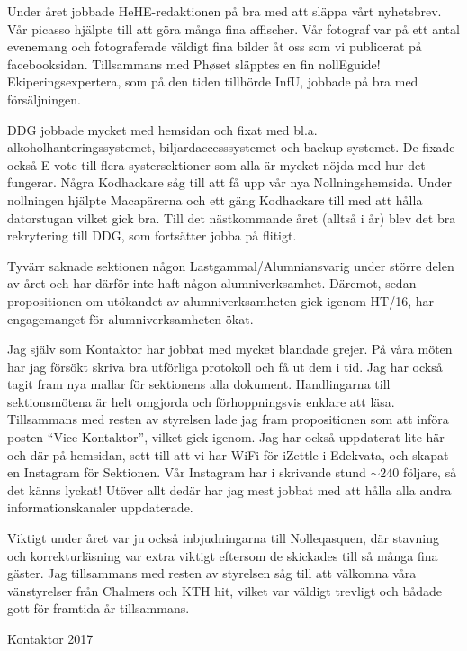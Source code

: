 \documentclass[../_main/handlingar.tex]{subfiles}
\begin{document}

Under året jobbade HeHE-redaktionen på bra med att släppa vårt nyhetsbrev. Vår picasso hjälpte till att göra många fina affischer. Vår fotograf var på ett antal evenemang och fotograferade väldigt fina bilder åt oss som vi publicerat på facebooksidan. Tillsammans med Ph\o set släpptes en fin nollEguide! Ekiperingsexpertera, som på den tiden tillhörde InfU, jobbade på bra med försäljningen.

DDG jobbade mycket med hemsidan och fixat med bl.a. alkoholhanteringssystemet, biljardaccesssystemet och backup-systemet. De fixade också E-vote till flera systersektioner som alla är mycket nöjda med hur det fungerar. Några Kodhackare såg till att få upp vår nya Nollningshemsida. Under nollningen hjälpte Macapärerna och ett gäng Kodhackare till med att hålla datorstugan vilket gick bra. Till det nästkommande året (alltså i år) blev det bra rekrytering till DDG, som fortsätter jobba på flitigt.

Tyvärr saknade sektionen någon Lastgammal/Alumniansvarig under större delen av året och har därför inte haft någon alumniverksamhet. Däremot, sedan propositionen om utökandet av alumniverksamheten gick igenom HT/16, har engagemanget för alumniverksamheten ökat.

Jag själv som Kontaktor har jobbat med mycket blandade grejer. På våra möten har jag försökt skriva bra utförliga protokoll och få ut dem i tid. Jag har också tagit fram nya mallar för sektionens alla dokument. Handlingarna till sektionsmötena är helt omgjorda och förhoppningsvis enklare att läsa. Tillsammans med resten av styrelsen lade jag fram propositionen som att införa posten ``Vice Kontaktor'', vilket gick igenom. Jag har också uppdaterat lite här och där på hemsidan, sett till att vi har WiFi för iZettle i Edekvata, och skapat en Instagram för Sektionen. Vår Instagram har i skrivande stund $\sim240$ följare, så det känns lyckat! Utöver allt dedär har jag mest jobbat med att hålla alla andra informationskanaler uppdaterade.

Viktigt under året var ju också inbjudningarna till Nolleqasquen, där stavning och korrekturläsning var extra viktigt eftersom de skickades till så många fina gäster. Jag tillsammans med resten av styrelsen såg till att välkomna våra vänstyrelser från Chalmers och KTH hit, vilket var väldigt trevligt och bådade gott för framtida år tillsammans.

\begin{signatures}{1}
    \mvh
    \signature{Johan Karlberg}{Kontaktor 2017}
\end{signatures}
\end{document}
